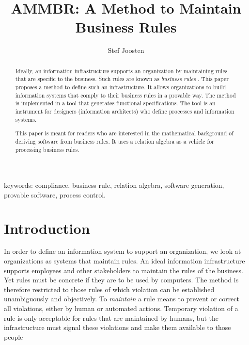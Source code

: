 \documentclass[11pt,a4paper,fleqn,oneside]{article}
\title{AMMBR: A Method to Maintain Business Rules}
\author{Stef Joosten}
\def\define#1{\label{dfn:#1}{\em #1}\index{#1}}
\begin{document}
\maketitle
\begin{abstract}
	Ideally, an information infrastructure supports an organization by maintaining rules that are specific to the business.
	Such rules are known as \define{business rules} \cite{BRM}.
	This paper proposes a method to define such an infrastructure.
	It allows organizations to build information systems that comply to their business rules in a provable way.
	The method is implemented in a tool that generates functional specifications.
	The tool is an instrument for designers (information architects) who define processes and information systems.

	This paper is meant for readers who are interested in the mathematical background of
	deriving software from business rules.
	It uses a relation algebra as a vehicle for processing business rules.
\end{abstract}
keywords: compliance, business rule, relation algebra, software generation, provable software, process control.
\section{Introduction}
	In order to define an information system to support an organization,
	we look at organizations as systems that maintain rules.
	An ideal information infrastructure supports employees and other stakeholders to maintain the rules of the business.
	Yet rules must be concrete if they are to be used by computers.
	The method is therefore restricted to those rules of which
	violation can be established unambiguously and objectively.
	To {\em maintain} a rule means to prevent or correct all violations, either by human or automated actions.
	Temporary violation of a rule is only acceptable for rules that are maintained by humans,
	but the infrastructure must signal these violations and make them available to those people
	
\end{document}
